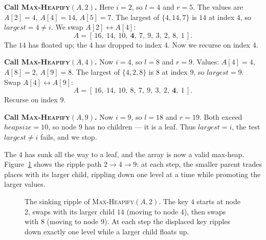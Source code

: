 \textbf{Call \textsc{Max-Heapify}$(A,2)$.} Here $i=2$, so $l=4$ and $r=5$. The
values are $A[2]=4$, $A[4]=14$, $A[5]=7$. The largest of $\{4,14,7\}$ is $14$ at
index $4$, so $\mathit{largest}=4 \ne i$. We swap $A[2] \leftrightarrow A[4]$:
\[
  A = [\,16,\ 14,\ 10,\ \mathbf{4},\ 7,\ 9,\ 3,\ 2,\ 8,\ 1\,].
\]
The $14$ has floated up; the $4$ has dropped to index $4$. Now we recurse on
index $4$.

\textbf{Call \textsc{Max-Heapify}$(A,4)$.} Now $i=4$, so $l=8$ and $r=9$. Values:
$A[4]=4$, $A[8]=2$, $A[9]=8$. The largest of $\{4,2,8\}$ is $8$ at index $9$, so
$\mathit{largest}=9$. Swap $A[4] \leftrightarrow A[9]$:
\[
  A = [\,16,\ 14,\ 10,\ 8,\ 7,\ 9,\ 3,\ 2,\ \mathbf{4},\ 1\,].
\]
Recurse on index $9$.

\textbf{Call \textsc{Max-Heapify}$(A,9)$.} Now $i=9$, so $l=18$ and $r=19$. Both
exceed $\mathit{heapsize}=10$, so node $9$ has no children --- it is a leaf.
Thus $\mathit{largest}=i$, the test $\mathit{largest}\ne i$ fails, and we stop.

The $4$ has sunk all the way to a leaf, and the array is now a valid max-heap.
Figure~\ref{ch06:fig-heapify-ripple} shows the ripple path $2 \to 4 \to 9$: at each
step, the smaller parent trades places with its larger child, rippling down one level
at a time while promoting the larger values.

\begin{figure}[H]
\centering
{}
\caption{The sinking ripple of \textsc{Max-Heapify}$(A,2)$. The key $4$ starts at node $2$,
swaps with its larger child $14$ (moving to node $4$), then swaps with $8$ (moving to node $9$).
At each step the displaced key ripples down exactly one level while a larger child floats up.}
\label{ch06:fig-heapify-ripple}
\end{figure}

